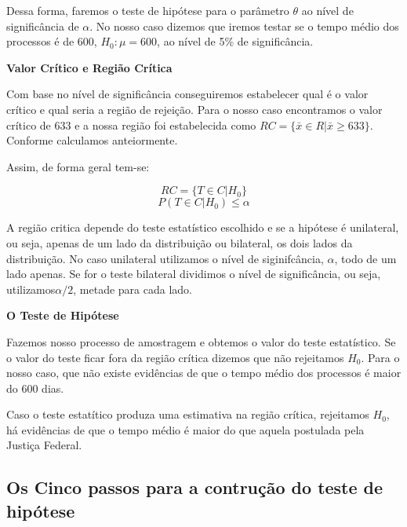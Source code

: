 \documentclass[
  letterpaper,
  DIV=11,
  numbers=noendperiod]{scrreprt}
\begin{document}
Dessa forma, faremos o teste de hipótese para o parâmetro \(\theta\) ao
nível de significância de \(\alpha\). No nosso caso dizemos que iremos
testar se o tempo médio dos processos é de 600, \(H_0: \mu=600\), ao
nível de 5\% de significância.

\textbf{Valor Crítico e Região Crítica}

Com base no nível de significância conseguiremos estabelecer qual é o
valor crítico e qual seria a região de rejeição. Para o nosso caso
encontramos o valor crítico de 633 e a nossa região foi estabelecida
como \(RC =\{\bar{x} \in R | \bar{x} \geq 633\}\). Conforme calculamos
anteiormente.

Assim, de forma geral tem-se:

\[RC =\{T \in C| H_0\}\] \[P(T \in C|H_0)\leq\alpha\]

\begin{tcolorbox}[enhanced jigsaw, leftrule=.75mm, coltitle=black, colframe=quarto-callout-warning-color-frame, toprule=.15mm, opacitybacktitle=0.6, bottomtitle=1mm, bottomrule=.15mm, titlerule=0mm, toptitle=1mm, title=\textcolor{quarto-callout-warning-color}{\faExclamationTriangle}\hspace{0.5em}{Teste Unilateral e Bilateral}, arc=.35mm, breakable, opacityback=0, colbacktitle=quarto-callout-warning-color!10!white, colback=white, left=2mm, rightrule=.15mm]

A região critica depende do teste estatístico escolhido e se a hipótese
é unilateral, ou seja, apenas de um lado da distribuição ou bilateral,
os dois lados da distribuição. No caso unilateral utilizamos o nível de
siginifcância, \(\alpha\), todo de um lado apenas. Se for o teste
bilateral dividimos o nível de significância, ou seja,
utilizamos\(\alpha /2\), metade para cada lado.

\end{tcolorbox}

\textbf{O Teste de Hipótese}

Fazemos nosso processo de amostragem e obtemos o valor do teste
estatístico. Se o valor do teste ficar fora da região crítica dizemos
que não rejeitamos \(H_0\). Para o nosso caso, que não existe evidências
de que o tempo médio dos processos é maior do 600 dias.

Caso o teste estatítico produza uma estimativa na região crítica,
rejeitamos \(H_0\), há evidências de que o tempo médio é maior do que
aquela postulada pela Justiça Federal.

\subsection{Os Cinco passos para a contrução do teste de
hipótese}\label{os-cinco-passos-para-a-contruuxe7uxe3o-do-teste-de-hipuxf3tese}
\end{document}

